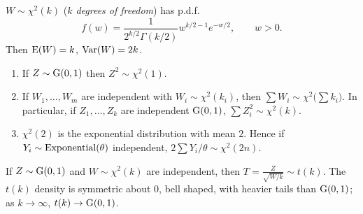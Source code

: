 \begin{definition}
$W\sim\chi^2(k)$ (\emph{$k$ degrees of freedom}) has p.d.f.\
\[ f(w) = \frac{1}{2^{k/2}\Gamma(k/2)}w^{k/2-1}e^{-w/2},\qquad w>0. \]
Then $\operatorname{E}(W)=k$,
$\operatorname{Var}(W) = 2k$.
\end{definition}

\begin{theorem}
\begin{enumerate}
  \item If $Z\sim\operatorname{G}(0,1)$ then $Z^2\sim\chi^2(1)$.
  \item If $W_1,\dots,W_m$ are independent with $W_i\sim\chi^2(k_i)$, then
        $\sum W_i\sim\chi^2\big(\sum k_i\big)$. In particular, if $Z_1,\dots,Z_k$ are
        independent $\operatorname{G}(0,1)$, $\sum Z_i^2 \sim\chi^2(k)$.
  \item $\chi^2(2)$ is the exponential distribution with mean $2$. Hence if
        $Y_i\sim\operatorname{Exponential}(\theta)$ independent, $2\sum Y_i/\theta\sim\chi^2(2n)$.
\end{enumerate}
\end{theorem}

\begin{definition}[Student $t$]
If $Z\sim\operatorname{G}(0,1)$ and $W\sim\chi^2(k)$ are independent, then
$T = \frac{Z}{\sqrt{W/k}}\sim t(k)$. The $t(k)$ density is symmetric about $0$, bell
shaped, with heavier tails than $\operatorname{G}(0,1)$; as $k\to\infty$, $t(k)\to\operatorname{G}(0,1)$.
\end{definition}


